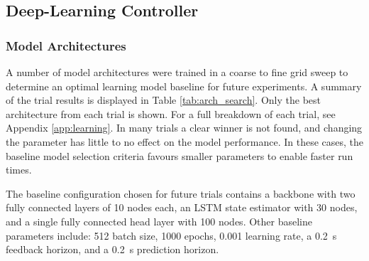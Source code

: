 \subsection{Deep-Learning Controller}


\subsubsection{Model Architectures}
A number of model architectures were trained in a coarse to fine grid sweep to determine an optimal learning model baseline for future experiments. A summary of the trial results is displayed in Table \ref{tab:arch_search}. Only the best architecture from each trial is shown. For a full breakdown of each trial, see Appendix \ref{app:learning}. In many trials a clear winner is not found, and changing the parameter has little to no effect on the model performance. In these cases, the baseline model selection criteria favours smaller parameters to enable faster run times. 

\begin{table}[h]
    \centering
    \caption{Model architecture search trial summary}
    \label{tab:arch_search}
\end{table}

The baseline configuration chosen for future trials contains a backbone with two fully connected layers of 10 nodes each, an LSTM state estimator with 30 nodes, and a single fully connected head layer with 100 nodes. Other baseline parameters include: 512 batch size, 1000 epochs, 0.001 learning rate, a \SI{0.2}{s} feedback horizon, and a \SI{0.2}{s} prediction horizon. 

